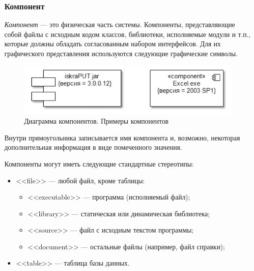 \documentclass[a4paper,12pt]{report}
\begin{document}
\subsubsection*{Компонент}
\textit{Компонент} ---  это физическая часть системы. Компоненты, представляющие собой файлы с исходным кодом классов, библиотеки, исполняемые модули и т.п., которые должны обладать согласованным набором интерфейсов. Для их графического представления используются следующие графические символы. 
\begin{figure}[h!]
	\centering
	\includegraphics[width=0.6\linewidth]{images/components}
	\caption{Диаграмма компонентов. Примеры компонентов}
	\label{fig:components}
\end{figure}

Внутри прямоугольника записывается имя компонента и, возможно, некоторая дополнительная информация в виде помеченного значения.

Компоненты могут иметь следующие стандартные стереотипы:
\begin{itemize}
	 \item <<file>> --- любой файл, кроме таблицы:
	 \begin{itemize}
	 	\item <<executable>> --- программа (исполняемый файл);
	 	\item <<library>> --- статическая или динамическая библиотека;
	 	\item <<source>> --- файл с исходным текстом программы;
	 	\item <<document>> --- остальные файлы (например, файл справки);
	 	
	 \end{itemize}
	
	\item  <<table>> --- таблица базы данных.
\end{itemize}
\end{document}
